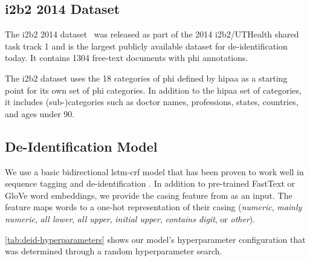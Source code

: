 \subsection{i2b2 2014 Dataset}
%
The i2b2 2014 dataset~\citep{stubbs2015annotating} was released as part of the 2014 i2b2/UTHealth shared task track 1 and is the largest publicly available dataset for de-identification today.
%
It contains 1304 free-text documents with \ac{phi} annotations.
%

%
The i2b2 dataset uses the 18 categories of \ac{phi} defined by \ac{hipaa} as a starting point for its own set of \ac{phi} categories.
%
In addition to the \ac{hipaa} set of categories, it includes (sub-)categories such as doctor names, professions, states, countries, and ages under 90.

\subsection{De-Identification Model}\label{sec:deidentification-model}
%
We use a basic bidirectional \ac{lstm}-\ac{crf} model that has been proven to work well in sequence tagging \citep{huang2015bidirectional,lample2016neural} and de-identification \citep{dernoncourt2017identification,liu2017identification}.
%
In addition to pre-trained FastText \citep{bojanowski2016enriching} or GloVe \citep{pennington2014glove} word embeddings, we provide the casing feature from \citet{reimers2017optimal} as an input.
%
The feature maps words to a one-hot representation of their casing (\textit{numeric}, \textit{mainly numeric}, \textit{all lower}, \textit{all upper}, \textit{initial upper}, \textit{contains digit}, or \textit{other}).

%
\cref{tab:deid-hyperparameters} shows our model's hyperparameter configuration that was determined through a random hyperparameter search.

